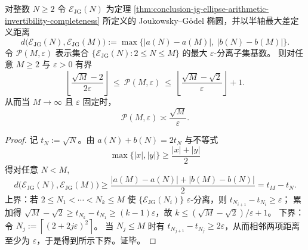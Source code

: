 \begin{theorem}\label{thm:conclusion-jg-ellipse-packing-sqrt-law}
对整数 \(N\ge 2\) 令 \(\mathcal{E}_{\mathrm{JG}}(N)\) 为定理 \ref{thm:conclusion-jg-ellipse-arithmetic-invertibility-completeness} 所定义的 Joukowsky--Gödel 椭圆，并以半轴最大差定义距离
\[
d\bigl(\mathcal{E}_{\mathrm{JG}}(N),\mathcal{E}_{\mathrm{JG}}(M)\bigr)
:=
\max\bigl\{|a(N)-a(M)|,\ |b(N)-b(M)|\bigr\}.
\]
令 \(\mathcal P(M,\varepsilon)\) 表示集合 \(\{\mathcal{E}_{\mathrm{JG}}(N):2\le N\le M\}\) 的最大 \(\varepsilon\)-分离子集基数。
则对任意 \(M\ge 2\) 与 \(\varepsilon>0\) 有界
\[
\left\lfloor \frac{\sqrt M-2}{2\varepsilon}\right\rfloor
\ \le\
\mathcal P(M,\varepsilon)
\ \le\
\left\lfloor \frac{\sqrt M-\sqrt 2}{\varepsilon}\right\rfloor+1.
\]
从而当 \(M\to\infty\) 且 \(\varepsilon\) 固定时，
\[
\mathcal P(M,\varepsilon)\asymp \frac{\sqrt M}{\varepsilon}.
\]
\end{theorem}
\begin{proof}
记 \(t_N:=\sqrt N\)。由 \(a(N)+b(N)=2t_N\) 与不等式
\[
\max\{|x|,|y|\}\ge \frac{|x|+|y|}{2}
\]
得对任意 \(N<M\),
\[
d\bigl(\mathcal{E}_{\mathrm{JG}}(N),\mathcal{E}_{\mathrm{JG}}(M)\bigr)
\ge
\frac{|a(M)-a(N)|+|b(M)-b(N)|}{2}
=
t_M-t_N.
\]
上界：若 \(2\le N_1<\cdots<N_k\le M\) 使 \(\{\mathcal{E}_{\mathrm{JG}}(N_i)\}\) \(\varepsilon\)-分离，则 \(t_{N_{i+1}}-t_{N_i}\ge\varepsilon\)；
累加得 \(\sqrt M-\sqrt2\ge t_{N_k}-t_{N_1}\ge(k-1)\varepsilon\)，故 \(k\le (\sqrt M-\sqrt2)/\varepsilon+1\)。
下界：令 \(N_j:=\left\lceil(2+2j\varepsilon)^2\right\rceil\)。
当 \(N_j\le M\) 时有 \(t_{N_{j+1}}-t_{N_j}\ge 2\varepsilon\)，从而相邻两项距离至少为 \(\varepsilon\)，于是得到所示下界。证毕。
\end{proof}

